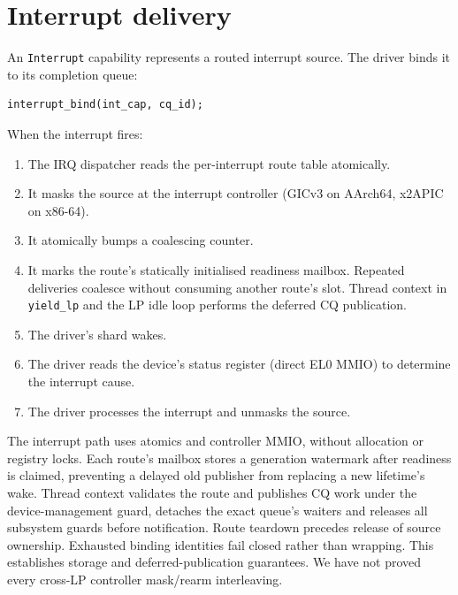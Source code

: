 \section{Interrupt delivery}

An \texttt{Interrupt} capability represents a routed interrupt source. The driver
binds it to its completion queue:

\begin{lstlisting}[style=rustCode]
interrupt_bind(int_cap, cq_id);
\end{lstlisting}

When the interrupt fires:

\begin{enumerate}
    \item The IRQ dispatcher reads the per-interrupt route table atomically.
    \item It masks the source at the interrupt controller (GICv3 on AArch64,
        x2APIC on x86-64).
    \item It atomically bumps a coalescing counter.
    \item It marks the route's statically initialised readiness mailbox.
        Repeated deliveries coalesce without consuming another route's slot.
        Thread context in \texttt{yield\_lp} and the LP idle loop performs
        the deferred CQ publication.
    \item The driver's shard wakes.
    \item The driver reads the device's status register (direct EL0 MMIO) to
        determine the interrupt cause.
    \item The driver processes the interrupt and unmasks the source.
\end{enumerate}

The interrupt path uses atomics and controller MMIO, without allocation or
registry locks. Each route's mailbox stores a generation watermark after
readiness is claimed, preventing a delayed old publisher from replacing a
new lifetime's wake. Thread context validates the route and publishes CQ work
under the device-management guard, detaches the exact queue's waiters and
releases all subsystem guards before notification. Route teardown precedes
release of source ownership. Exhausted binding identities fail closed rather
than wrapping. This establishes storage and deferred-publication guarantees.
We have not proved every cross-LP controller mask/rearm interleaving.

